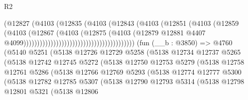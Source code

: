 \begin{lexlean}{R2}
\begin{coremodule}
                                                        (@12827
                                                          (@4103
                                                            (@12835
                                                              (@4103
                                                                (@12843
                                                                  (@4103
                                                                    (@12851
                                                                      (@4103
                                                                        (@12859
                                                                          (@4103
                                                                            (@12867
                                                                              (@4103
                                                                                (@12875
                                                                                  (@4103
                                                                                    (@12879
                                                                                      @12881
                                                                                      @4407
                                                                                      @4099)))))))))))))))))))))))))))))))))))))))))
    (fun (__b : @3850) =>
    @4760
      (@5140
        @5251
        (@5138
          @12726
          @12729
          @5258
          (@5138
            @12734
            @12737
            @5265
            (@5138
              @12742
              @12745
              @5272
              (@5138
                @12750
                @12753
                @5279
                (@5138
                  @12758
                  @12761
                  @5286
                  (@5138
                    @12766
                    @12769
                    @5293
                    (@5138
                      @12774
                      @12777
                      @5300
                      (@5138
                        @12782
                        @12785
                        @5307
                        (@5138
                          @12790
                          @12793
                          @5314
                          (@5138
                            @12798
                            @12801
                            @5321
                            (@5138
                              @12806

\end{coremodule}
\end{lexlean}
